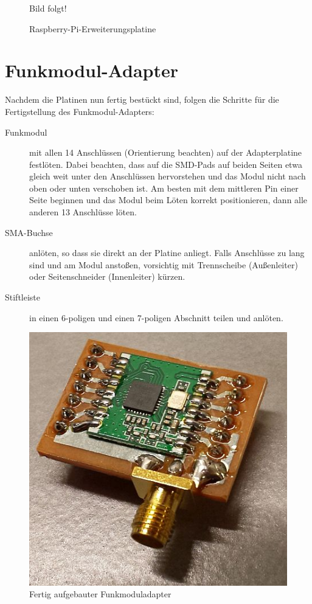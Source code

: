 \documentclass[paper=a4, parskip, numbers=noenddot, toc=listof, headsepline]{scrbook}
\begin{document}
				\begin{figure}
					\centering
					{\LARGE Bild folgt!}
					\caption{Raspberry-Pi-Erweiterungsplatine}
					\label{fig:raspiextension}
				\end{figure}

			\section{Funkmodul-Adapter}

				Nachdem die Platinen nun fertig bestückt sind, folgen die Schritte für die Fertigstellung des Funkmodul-Adapters:
				\begin{description}
					\item[Funkmodul] mit allen 14 Anschlüssen (Orientierung beachten) auf der Adapterplatine festlöten. Dabei beachten, dass auf die SMD-Pads auf beiden Seiten etwa gleich weit unter den Anschlüssen hervorstehen und das Modul nicht nach oben oder unten verschoben ist. Am besten mit dem mittleren Pin einer Seite beginnen und das Modul beim Löten korrekt positionieren, dann alle anderen 13 Anschlüsse löten.
					\item[SMA-Buchse] anlöten, so dass sie direkt an der Platine anliegt. Falls Anschlüsse zu lang sind und am Modul anstoßen, vorsichtig mit Trennscheibe (Außenleiter) oder Seitenschneider (Innenleiter) kürzen.
					\item[Stiftleiste] in einen 6-poligen und einen 7-poligen Abschnitt teilen und anlöten.
				\end{description}

				\begin{figure}
					\centering
					\includegraphics[width=.5\textwidth]{bilder/funkmoduladapter}
					\caption{Fertig aufgebauter Funkmoduladapter}
					\label{fig:funkmoduladapter}
				\end{figure}
\end{document}
